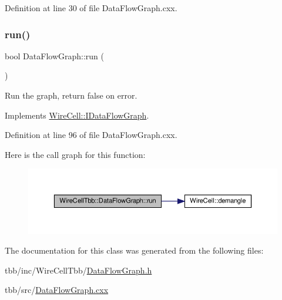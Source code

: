 Definition at line 30 of file Data\+Flow\+Graph.\+cxx.

\mbox{\label{class_wire_cell_tbb_1_1_data_flow_graph_ae8e14d9ad578b85a9e6faf4db69cc31b}} 
\subsubsection{\texorpdfstring{run()}{run()}}
{\footnotesize\ttfamily bool Data\+Flow\+Graph\+::run (\begin{DoxyParamCaption}{ }\end{DoxyParamCaption})\hspace{0.3cm}{\ttfamily [virtual]}}



Run the graph, return false on error. 



Implements \hyperlink{class_wire_cell_1_1_i_data_flow_graph_ab741ef1a0f772cb278dd2f111b54867e}{Wire\+Cell\+::\+I\+Data\+Flow\+Graph}.



Definition at line 96 of file Data\+Flow\+Graph.\+cxx.

Here is the call graph for this function\+:
\nopagebreak
\begin{figure}[H]
\begin{center}
\leavevmode
\includegraphics[width=350pt]{class_wire_cell_tbb_1_1_data_flow_graph_ae8e14d9ad578b85a9e6faf4db69cc31b_cgraph}
\end{center}
\end{figure}


The documentation for this class was generated from the following files\+:\begin{DoxyCompactItemize}
\item 
tbb/inc/\+Wire\+Cell\+Tbb/\hyperlink{_data_flow_graph_8h}{Data\+Flow\+Graph.\+h}\item 
tbb/src/\hyperlink{_data_flow_graph_8cxx}{Data\+Flow\+Graph.\+cxx}\end{DoxyCompactItemize}
